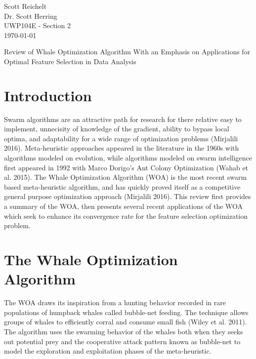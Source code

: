 \documentclass[11pt]{article}
\begin{document}
{ %
    \thispagestyle{empty}
    \begin{flushleft}
        Scott Reichelt\\
        Dr. Scott Herring\\
        UWP104E - Section 2\\
        \today\\
    \end{flushleft}
    \vspace{1em}
}
    \begin{center}
        Review of Whale Optimization Algorithm With an Emphasis on Applications for Optimal Feature Selection in Data Analysis
    \end{center}

\section*{Introduction} {
    Swarm algorithms are an attractive path for research for there relative easy to implement, unnecisity of knowledge of the gradient, ability to bypass local optima, and adaptability for a wide range of optimization problems (Mirjalili 2016).
    Meta-heuristic approaches appeared in the literature in the 1960s with algorithms modeled on evolution, while algorithms modeled on swarm intelligence first appeared in 1992 with Marco Dorigo's Ant Colony Optimization (Wahab et al. 2015).
    The Whale Optimization Algorithm (WOA) is the most recent swarm based meta-heuristic algorithm, and has quickly proved itself as a competitive general purpose optimization approach (Mirjalili 2016). 
    This review first provides a summary of the WOA, then presents several recent applications of the WOA which seek to enhance its convergence rate for the feature selection optimization problem.
}

\section*{The Whale Optimization Algorithm} {
    The WOA draws its inspiration from a hunting behavior recorded in rare populations of humpback whales called bubble-net feeding.
    The technique allows groups of whales to efficiently corral and consume small fish (Wiley et al. 2011).
    The algorithm uses the swarming behavior of the whales both when they seeks out potential prey and the cooperative attack pattern known as bubble-net to model the exploration and exploitation phases of the meta-heuristic.
}
\end{document}
